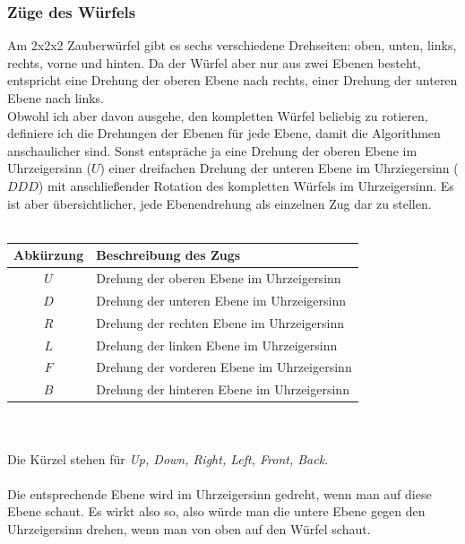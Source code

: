 \documentclass[12pt,a4paper, usenames, dvipsnames]{scrartcl}
\begin{document}
\subsubsection*{Züge des Würfels}
Am 2x2x2 Zauberwürfel gibt es sechs verschiedene Drehseiten: oben, unten, links, rechts, vorne und hinten. Da der Würfel aber nur aus zwei Ebenen besteht, entspricht eine Drehung der oberen Ebene nach rechts, einer Drehung der unteren Ebene nach links. \\
Obwohl ich aber davon ausgehe, den kompletten Würfel beliebig zu rotieren, definiere ich die Drehungen der Ebenen für jede Ebene, damit die Algorithmen anschaulicher sind. Sonst entspräche ja eine Drehung der oberen Ebene im Uhrzeigersinn ($U$) einer dreifachen Drehung der unteren Ebene im Uhrziegersinn ($DDD$) mit anschließender Rotation des kompletten Würfels im Uhrzeigersinn. Es ist aber übersichtlicher, jede Ebenendrehung als einzelnen Zug dar zu stellen. \\
\\
\begin{tabular}{|c|l|}
\hline
Abkürzung & Beschreibung des Zugs \\
\hline
\hline
$U$ & Drehung der oberen Ebene im Uhrzeigersinn \\
\hline
$D$ & Drehung der unteren Ebene im Uhrzeigersinn \\
\hline
$R$ & Drehung der rechten Ebene im Uhrzeigersinn \\
\hline
$L$ & Drehung der linken Ebene im Uhrzeigersinn \\%
\hline
$F$ & Drehung der vorderen Ebene im Uhrzeigersinn \\
\hline
$B$ & Drehung der hinteren Ebene im Uhrzeigersinn \\
\hline
\end{tabular} \\
\\
Die Kürzel stehen für \textit{Up, Down, Right, Left, Front, Back}.  \\
\\
Die entsprechende Ebene wird im Uhrzeigersinn gedreht, wenn man auf diese Ebene schaut. Es wirkt also so, also würde man die untere Ebene gegen den Uhrzeigersinn drehen, wenn man von oben auf den Würfel schaut. 
\newpage










\end{document}
